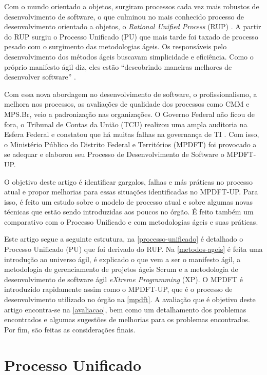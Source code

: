 \documentclass[
	article,			%
	11pt,				%
	oneside,			%
	a4paper,			%
	english,			%
	brazil,				%
	sumario=tradicional
	]{abntex2}
\begin{document}
Com o mundo orientado a objetos, surgiram processos cada vez mais robustos de
desenvolvimento de software, o que culminou no mais conhecido processo de
desenvolvimento orientado a objetos, o \textit{Rational Unified Process} (RUP)
\cite{kruchten2004rational}. A partir do RUP surgiu o Processo Unificado (PU)
que mais tarde foi taxado de processo pesado com o surgimento das metodologias
ágeis. Os responsáveis pelo desenvolvimento dos métodos ágeis buscavam
simplicidade e eficiência. Como o próprio manifesto ágil diz, eles estão
``descobrindo maneiras melhores de desenvolver software'' \cite{agilemanifesto}.

Com essa nova abordagem no desenvolvimento de software, o profissionalismo, a
melhora nos processos, as avaliações de qualidade dos processos como CMM e
MPS.Br, veio a padronização nas organizações. O Governo Federal não ficou de
fora, o Tribunal de Contas da União (TCU) realizou uma ampla auditoria na Esfera
Federal e constatou que há muitas falhas na governança de TI
\cite{dou-20080818}. Com isso, o Ministério Público do Distrito Federal e
Territórios (MPDFT) foi provocado a se adequar e elaborou seu Processo de
Desenvolvimento de Software o MPDFT-UP.

O objetivo deste artigo é identificar gargalos, falhas e más práticas no
processo atual e propor melhorias para essas situações identificadas no
MPDFT-UP. Para isso, é feito um estudo sobre o modelo de processo atual e sobre
algumas novas técnicas que estão sendo introduzidas aos poucos no órgão. É feito
também um comparativo com o Processo Unificado e com metodologias ágeis e suas
práticas.

Este artigo segue a seguinte estrutura, na \autoref{processo-unificado} é
detalhado o Processo Unificado (PU) que foi derivado do RUP. Na
\autoref{metodos-ageis} é feita uma introdução ao universo ágil, é explicado o
que vem a ser o manifesto ágil, a metodologia de gerenciamento de projetos ágeis
Scrum e a metodologia de desenvolvimento de software ágil \textit{eXtreme
Programming} (XP). O MPDFT é introduzido rapidamente assim como o MPDFT-UP, que
é o processo de desenvolvimento utilizado no órgão na \autoref{mpdft}. A
avaliação que é objetivo deste artigo encontra-se na \autoref{avaliacao}, bem
como um detalhamento dos problemas encontrados e algumas sugestões de melhorias
para os problemas encontrados. Por fim, são feitas as considerações finais.

\section{Processo Unificado}
\end{document}
